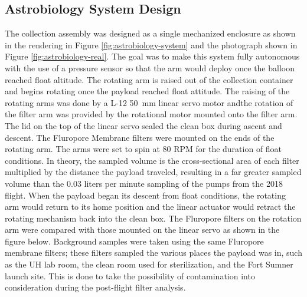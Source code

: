 \subsection{Astrobiology System Design}
\label{sec:Astrobiology-Design}

The collection assembly was designed as a single mechanized enclosure as shown in the rendering in Figure \ref{fig:astrobiology-system} and the photograph shown in Figure \ref{fig:astrobiology-real}. The goal was to make this system fully autonomous with the use of a pressure sensor so that the arm would deploy once the balloon reached float altitude.  The rotating arm is raised out of the collection container and begins rotating once the payload reached float attitude. The raising of the rotating arms was done by a L-12 \SI{50}{\milli\meter} linear servo motor andthe rotation of the filter arm was provided by the rotational motor mounted onto the filter arm.  The lid on the top of the linear servo sealed the clean box during ascent and descent.  The Fluropore Membrane filters were mounted on the ends of the rotating arm.  The arms were set to spin at 80 RPM for the duration of float conditions.  In theory, the sampled volume is the cross-sectional area of each filter multiplied by the distance the payload traveled, resulting in a far greater sampled volume than the 0.03 liters per minute sampling of the pumps from the 2018 flight. When the payload began its descent from float conditions, the rotating arm would return to its home position and the linear actuator would retract the rotating mechanism back into the clean box.  The Fluropore filters on the rotation arm were compared with those mounted on the linear servo as shown in the figure below.  Background samples were taken using the same Fluropore membrane filters; these filters sampled the various places the payload was in, such as the UH lab room, the clean room used for sterilization, and the Fort Sumner launch site. This is done to take the possibility of contamination into consideration during the post-flight filter analysis.

